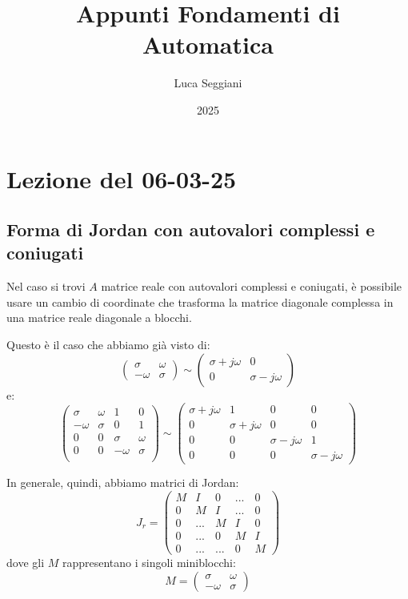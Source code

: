 \documentclass[a4paper,11pt]{article}
\title{Appunti Fondamenti di Automatica}
\author{Luca Seggiani}
\date{2025}
\begin{document}
\section{Lezione del 06-03-25}

\thispagestyle{empty}
\pagestyle{fancy}

\subsection{Forma di Jordan con autovalori complessi e coniugati}
Nel caso si trovi $A$ matrice reale con autovalori complessi e coniugati, è possibile usare un cambio di coordinate che trasforma la matrice diagonale complessa in una matrice reale diagonale a blocchi.

Questo è il caso che abbiamo già visto di:
$$
\begin{pmatrix}
	\sigma & \omega \\
	-\omega & \sigma
\end{pmatrix}
\sim
\begin{pmatrix}
	\sigma + j\omega & 0 \\
	0 & \sigma - j \omega
\end{pmatrix}
$$
e:
$$
\begin{pmatrix}
	\sigma & \omega & 1 & 0 \\
	-\omega & \sigma & 0 & 1 \\
	0 & 0 & \sigma & \omega \\
	0 & 0 & -\omega & \sigma \\
\end{pmatrix}
\sim
\begin{pmatrix}
	\sigma + j \omega & 1 & 0 & 0 \\
	0 & \sigma + j \omega & 0 & 0 \\
	0 & 0 & \sigma - j \omega & 1 \\
	0 & 0 & 0 & \sigma - j \omega
\end{pmatrix} 
$$

In generale, quindi, abbiamo matrici di Jordan:
$$
J_r = \begin{pmatrix}
	M & I & 0 & ... & 0 \\
	0 & M & I & ... & 0 \\
	0 & ... & M & I & 0 \\ 
	0 & ... &  0 & M & I \\
	0 & ... & ... & 0 & M
\end{pmatrix}
$$
dove gli $M$ rappresentano i singoli miniblocchi:
$$
M = \begin{pmatrix}
	\sigma & \omega \\
	-\omega & \sigma
\end{pmatrix}
$$
\end{document}
